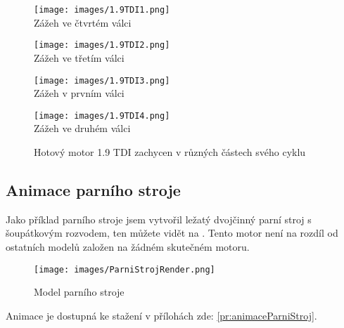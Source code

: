 \begin{figure}[H]
    \begin{minipage}[b]{0.5\linewidth}
        \centering
        \texttt{[image: images/1.9TDI1.png]}\\
        {Zážeh ve čtvrtém válci}
        \vspace{4ex}
    \end{minipage}
    \begin{minipage}[b]{0.5\linewidth}
        \centering
        \texttt{[image: images/1.9TDI2.png]}\\
        {Zážeh ve třetím válci}
        \vspace{4ex}
    \end{minipage}
    \begin{minipage}[b]{0.5\linewidth}
        \centering
        \texttt{[image: images/1.9TDI3.png]}\\
        {Zážeh v prvním válci}
        \vspace{4ex}
    \end{minipage}
    \begin{minipage}[b]{0.5\linewidth}
        \centering
        \texttt{[image: images/1.9TDI4.png]}\\
        {Zážeh ve druhém válci}
        \vspace{4ex}
    \end{minipage}
    \caption{Hotový motor 1.9 TDI zachycen v různých částech svého cyklu \jaObr}
    \label{obr:1.9TDIUkazkaHotovo}
\end{figure}

\newpage

\subsection{Animace parního stroje}
{Jako příklad parního stroje jsem vytvořil ležatý dvojčinný parní stroj s šoupátkovým rozvodem, ten můžete vidět na . Tento motor není na rozdíl od ostatních modelů založen na žádném skutečném motoru.}

\begin{figure}[H]
    \centering
    \texttt{[image: images/ParniStrojRender.png]}
    \caption{Model parního stroje \jaObr}
    \label{obr:ParniStrojRender}
\end{figure}

{Animace je dostupná ke stažení v přílohách zde: \ref{pr:animaceParniStroj}.}

\newpage

